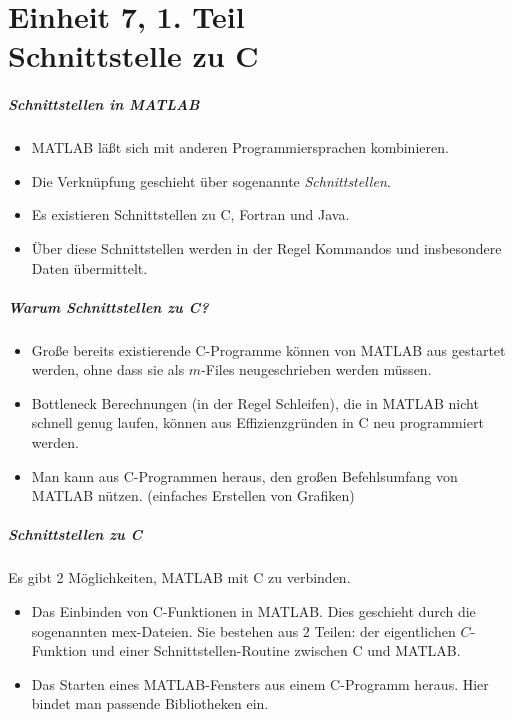 %
\subtitle{Einheit 7 \\ Schnittstelle zu C}
\maketitle
\part{Einheit 7, 1. Teil \\ Schnittstelle zu C}
%
%
\begin{frame}[fragile]\frametitle{Schnittstellen in MATLAB}
\begin{itemize}
\item MATLAB l\"a{\ss}t sich mit anderen Programmiersprachen kombinieren. 
\item Die Verkn\"upfung geschieht \"uber sogenannte {\it Schnittstellen}. 
\item Es existieren Schnittstellen zu C, Fortran und Java.
\item \"Uber diese Schnittstellen werden in der Regel Kommandos und
  insbesondere Daten \"ubermittelt.
\end{itemize}
\end{frame}
%
%
\begin{frame}[fragile]\frametitle{Warum Schnittstellen zu C?}
\begin{itemize}
\item Gro{\ss}e bereits existierende C-Programme k\"onnen von MATLAB aus
  gestartet werden, ohne dass sie als $m$-Files neugeschrieben werden
  m\"ussen. 
\item Bottleneck Berechnungen (in der Regel Schleifen), die in MATLAB nicht
  schnell genug laufen, k\"onnen aus Effizienzgr\"unden in C neu programmiert
  werden. 
\item Man kann aus C-Programmen heraus, den gro{\ss}en Befehlsumfang von
  MATLAB n\"utzen. (einfaches Erstellen von Grafiken)
\end{itemize}
\end{frame}

%
%
\begin{frame}[fragile]\frametitle{Schnittstellen zu C}
Es gibt 2 M\"oglichkeiten, MATLAB mit C zu verbinden. 
\begin{itemize}
\item Das Einbinden von C-Funktionen in MATLAB. Dies geschieht durch die sogenannten
      mex-Dateien. Sie bestehen aus 2 Teilen: der eigentlichen $C$-Funktion und
      einer Schnittstellen-Routine zwischen C und MATLAB.
\item Das Starten eines MATLAB-Fensters aus einem C-Programm heraus. Hier bindet
      man passende Bibliotheken ein.
\end{itemize}
\end{frame}
%
%
